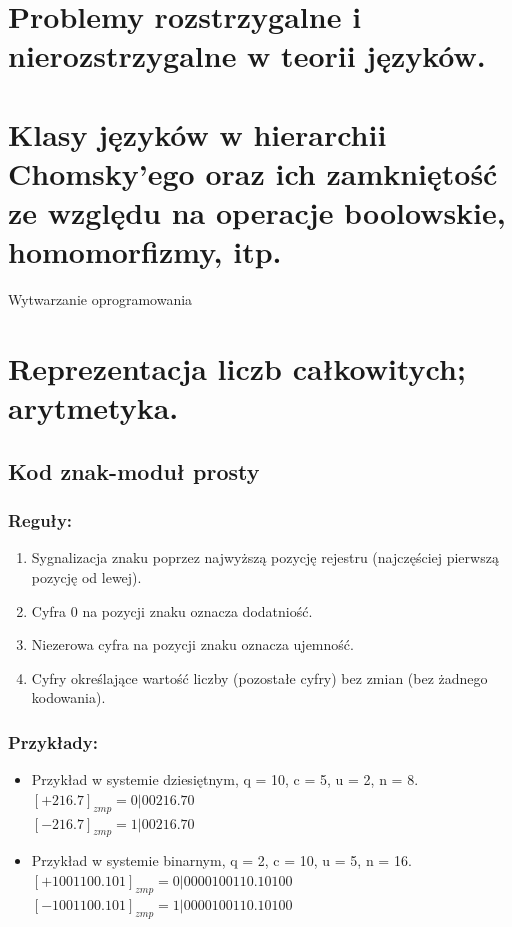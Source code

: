 \documentclass[12pt]{article}
\begin{document}
    \section{Problemy rozstrzygalne i nierozstrzygalne w teorii języków.}
    \section{Klasy języków w hierarchii Chomsky’ego oraz ich zamkniętość ze względu na operacje boolowskie, homomorfizmy, itp.}


    {\Large Wytwarzanie oprogramowania}

    \newpage
    
    \section{Reprezentacja liczb całkowitych; arytmetyka.}
    
    \subsection{Kod znak-moduł prosty}
    \subsubsection{Reguły:}
    \begin{enumerate}
        \item Sygnalizacja znaku poprzez najwyższą pozycję
        rejestru (najczęściej pierwszą pozycję od lewej).
        \item Cyfra 0 na pozycji znaku oznacza dodatniość.
        \item Niezerowa cyfra na pozycji znaku oznacza ujemność.
        \item Cyfry określające wartość liczby (pozostałe cyfry) bez zmian (bez żadnego kodowania).
    \end{enumerate}
    \subsubsection{Przykłady:}
    \begin{itemize}
        \item Przykład w systemie dziesiętnym, q = 10,
        c = 5, u = 2, n = 8.\\
        $[+216.7]_{zmp} = 0|00216.70$\\
        $[-216.7]_{zmp} = 1|00216.70$
        \item Przykład w systemie binarnym, q = 2, c = 10,
        u = 5, n = 16.\\
        $[+1001100.101]_{zmp} = 0|0000100110.10100$\\
        $[-1001100.101]_{zmp} = 1|0000100110.10100$
    \end{itemize}
\end{document}
